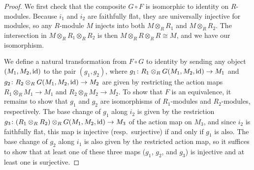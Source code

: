\documentclass[pdftex]{sigma}
\theoremstyle{definition}
\begin{document}
\begin{proof}
We first check that the composite $G \circ F$ is isomorphic to identity on $R$-modules. Because $i_1$ and $i_2$ are faithfully flat, they are universally injective for modules, so any $R$-module $M$ injects into both $M \otimes_{R} R_1$ and $M \otimes_{R} R_2$. The intersection in $M \otimes_{R} R_1 \otimes_{R} R_2$ is then $M \otimes_{R} R \otimes_{R} R \cong M$, and we have our isomorphism.

We define a natural transformation from $F \circ G$ to identity by sending any object $(M_1, M_2, {\rm id})$ to the pair $(g_1,g_2)$, where $g_1\colon R_1 \otimes_{R} G(M_1,M_2,{\rm id}) \to M_1$ and $g_2\colon R_2 \otimes_{R} G(M_1,M_2,{\rm id}) \to M_2$ are given by restricting the action maps $R_1 \otimes_{R} M_1 \to M_1$ and $R_2 \otimes_{R} M_2 \to M_2$. To show that $F$ is an equivalence, it remains to show that $g_1$ and $g_2$ are isomorphisms of $R_1$-modules and $R_2$-modules, respectively. The base change of $g_1$ along $i_2$ is given by the restriction $g_3\colon (R_1 \otimes_{R} R_2) \otimes_{R} G(M_1,M_2,{\rm id}) \to M_3$ of the action map on $M_3$, and since $i_2$ is faithfully flat, this map is injective (resp.~surjective) if and only if $g_1$ is also. The base change of $g_2$ along $i_1$ is also given by the restricted action map, so it suffices to show that at least one of these three maps ($g_1$, $g_2$, and $g_3$) is injective and at least one is surjective.


\end{proof}
\end{document}

